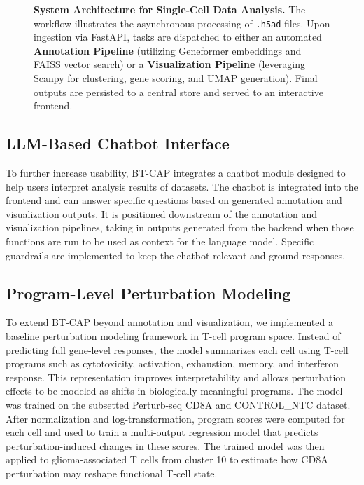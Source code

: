 \documentclass[conference]{IEEEtran}
\begin{document}
\begin{figure}[htbp]
    
    \caption{\textbf{System Architecture for Single-Cell Data Analysis.} The workflow illustrates the asynchronous processing of \texttt{.h5ad} files. Upon ingestion via FastAPI, tasks are dispatched to either an automated \textbf{Annotation Pipeline} (utilizing Geneformer embeddings and FAISS vector search) or a \textbf{Visualization Pipeline} (leveraging Scanpy for clustering, gene scoring, and UMAP generation). Final outputs are persisted to a central store and served to an interactive frontend.}
    \label{fig:analysis_pipeline}
\end{figure}

\subsection{LLM-Based Chatbot Interface}
To further increase usability, BT-CAP integrates a chatbot module designed to help users interpret analysis results of datasets. The chatbot is integrated into the frontend and can answer specific questions based on generated annotation and visualization outputs. It is positioned downstream of the annotation and visualization pipelines, taking in outputs generated from the backend when those functions are run to be used as context for the language model. Specific guardrails are implemented to keep the chatbot relevant and ground responses.

\subsection{Program-Level Perturbation Modeling}
To extend BT-CAP beyond annotation and visualization, we implemented a baseline perturbation modeling framework in T-cell program space. Instead of predicting full gene-level responses, the model summarizes each cell using T-cell programs such as cytotoxicity, activation, exhaustion, memory, and interferon response. This representation improves interpretability and allows perturbation effects to be modeled as shifts in biologically meaningful programs. The model was trained on the subsetted Perturb-seq CD8A and CONTROL\_NTC dataset. After normalization and log-transformation, program scores were computed for each cell and used to train a multi-output regression model that predicts perturbation-induced changes in these scores. The trained model was then applied to glioma-associated T cells from cluster 10 to estimate how CD8A perturbation may reshape functional T-cell state.
\end{document}
